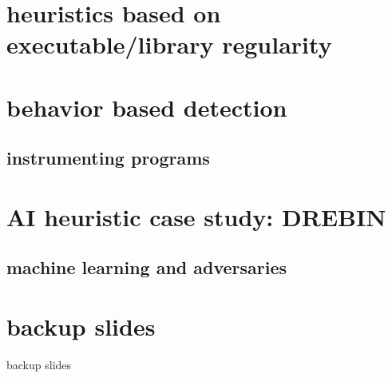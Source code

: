 \section{heuristics based on executable/library regularity}


\section{behavior based detection}


\subsection{instrumenting programs}


\section{AI heuristic case study: DREBIN}


\subsection{machine learning and adversaries}




\section{backup slides}
\begin{frame}{backup slides}
\end{frame}



